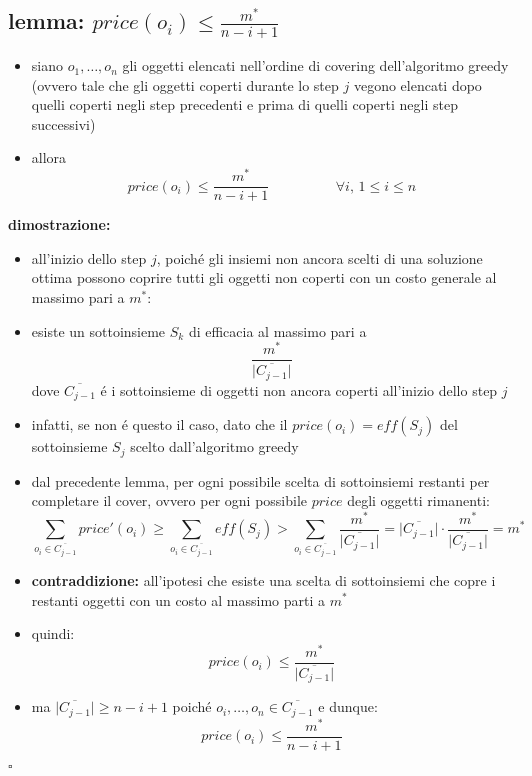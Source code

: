 \subsection*{lemma: $price(o_i)\leq\frac{m^*}{n-i+1}$}
\begin{flushleft}
	\begin{itemize}
		\item siano $o_1,\ldots,o_n$ gli oggetti elencati nell'ordine di covering dell'algoritmo
			greedy (ovvero tale che gli oggetti coperti durante lo step $j$ vegono elencati dopo
			quelli coperti negli step precedenti e prima di quelli coperti negli step successivi)
		\item allora
			$$price(o_i)\leq\frac{m^*}{n-i+1}\hspace{2cm}\forall i\text{, }1\leq i\leq n$$
	\end{itemize}
	\textbf{dimostrazione:}
	\begin{itemize}
		\item all'inizio dello step $j$, poich\'e gli insiemi non ancora scelti di una soluzione ottima possono coprire tutti gli oggetti non coperti con un costo generale al massimo pari a $m^*$:
		\item esiste un sottoinsieme $S_k$ di efficacia al massimo pari a
			$$\frac{m^*}{\vert\overline{C_{j-1}}\vert}$$
		dove $\overline{C_{j-1}}$ \'e i sottoinsieme di oggetti non ancora coperti all'inizio dello step $j$
		\item infatti, se non \'e questo il caso, dato che il $price(o_i)=eff(S_j)$ del sottoinsieme $S_j$ scelto dall'algoritmo greedy
		\item dal precedente lemma, per ogni possibile scelta di sottoinsiemi restanti per completare il cover, ovvero per ogni possibile $price$ degli oggetti rimanenti:
			$$\sum_{o_i\in\overline{C_{j-1}}}price'(o_i)\geq\sum_{o_i\in\overline{C_{j-1}}}eff(S_j)>\sum_{o_i\in\overline{C_{j-1}}}\frac{m^*}{\vert\overline{C_{j-1}}\vert}=\vert\overline{C_{j-1}}\vert\cdot\frac{m^*}{\vert\overline{C_{j-1}}\vert}=m^*$$
		\item \textbf{contraddizione:} all'ipotesi che esiste una scelta di sottoinsiemi che copre i restanti oggetti con un costo al massimo parti a $m^*$
		\item quindi:
			$$price(o_i)\leq\frac{m^*}{\vert\overline{C_{j-1}}\vert}$$
		\item ma $\vert\overline{C_{j-1}}\vert\geq n-i+1$ poich\'e $o_i,\ldots,o_n\in\overline{C_{j-1}}$ e dunque:
			$$price(o_i)\leq\frac{m^*}{n-i+1}$$
	\end{itemize}
	\hfill$\square$
\end{flushleft}


